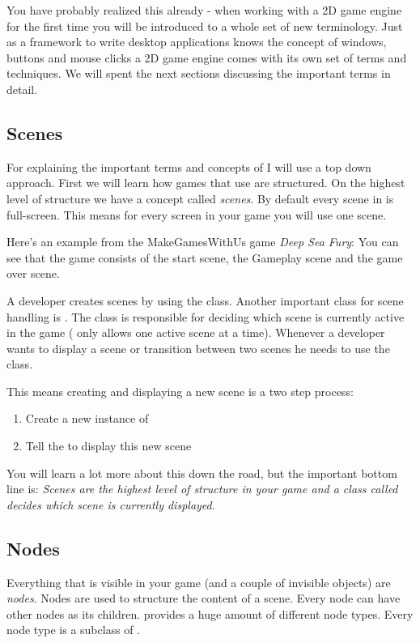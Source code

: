 You have probably realized this already - when working with a 2D game engine for
the first time you will be introduced to a whole set of new terminology. Just as a framework to write desktop
applications knows the concept of windows, buttons and mouse clicks a 2D game
engine comes with its own set of terms and techniques. We will spent the next
sections discussing the important terms in detail.

\subsection{Scenes}
For explaining the important terms and concepts of \cocos{} I will use a top
down approach. First we will learn how games that use \cocos{} are structured.
On the highest level of structure we have a concept called \textit{scenes}. By default every scene in
\cocos{} is full-screen. This means for every screen in your game you will use
one scene.

Here's an example from the MakeGamesWithUs game \textit{Deep Sea Fury}:
You can see that the game consists of the start scene, the Gameplay scene and
the game over scene.

A \cocos{} developer creates scenes by using the \ccscene{} class. Another
important \cocos{} class for scene handling is \ccdirector{}. The \ccdirector{}
class is responsible for deciding which scene is currently active in the game
(\cocos{} only allows one active scene at a time). Whenever a developer wants to
display a scene or transition between two scenes he needs to use the
\ccdirector{} class.

This means creating and displaying a new scene is a two step process:
\begin{enumerate}
\item Create a new instance of \ccscene{}
\item Tell the \ccdirector{} to display this new scene
\end{enumerate}

You will learn a lot more about this down the road, but the important bottom
line is: \textit{Scenes are the highest level of structure in your game and a
class called \ccdirector{} decides which scene is currently displayed}.

\subsection{Nodes}
Everything that is visible in your \cocos{} game (and a couple of invisible
objects) are \textit{nodes}. Nodes are used to structure the content of a scene.
Every node can have other nodes as its children. \cocos{} provides a huge amount
of different node types. Every node type is a subclass of \ccnode{}.

